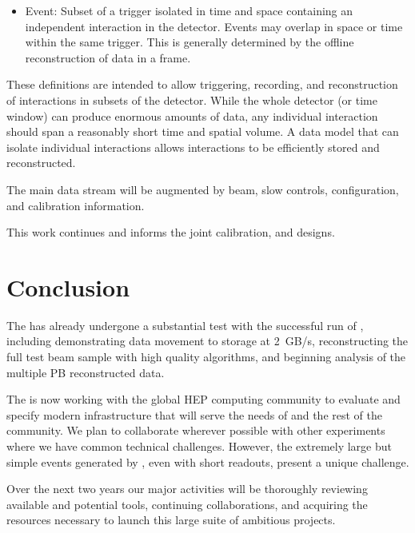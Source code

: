 {\begin{itemize}
\item{Event:} Subset of a trigger isolated in time and space containing an independent interaction in the detector. Events may overlap in space or time within the same trigger. This is generally determined by the offline reconstruction of data in a frame.

\end{itemize}

These definitions are intended to allow triggering, recording, and reconstruction of interactions in subsets of the detector. While the whole detector (or time window) can produce enormous amounts of data, any individual interaction should span a reasonably short time and spatial volume. A data model that can isolate individual interactions  allows interactions to be efficiently stored and reconstructed. 


The main data stream will be augmented by beam, slow controls,  configuration, and calibration information. 

This work continues and informs  the  joint  calibration,  and  designs.

}


\section{Conclusion}

The   has already undergone a substantial test with the successful run of , including demonstrating data movement to storage at \SI{2}{GB/s}, reconstructing the full test beam sample with high quality algorithms, and beginning analysis of the multiple PB reconstructed data. 

The  is now working with the global HEP computing community to evaluate and specify modern infrastructure that will serve the needs of  and the rest of the community.  We plan to collaborate wherever possible with other experiments where we have common technical challenges. However, the extremely large but simple events generated by  , even with short readouts, present a unique challenge. 

Over the next two years our major activities  will be  thoroughly reviewing available and potential tools, continuing collaborations, and acquiring the resources necessary to launch this large suite of ambitious projects. 



